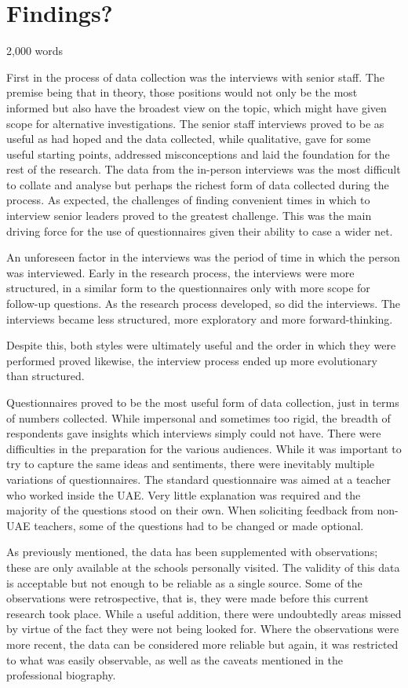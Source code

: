 \section{Findings?}
2,000 words 

First in the process of data collection was the interviews with senior staff. The premise being that in theory, those positions would not only be the most informed but also have the broadest view on the topic, which might have given scope for alternative investigations. The senior staff interviews proved to be as useful as had hoped and the data collected, while qualitative, gave for some useful starting points, addressed misconceptions and laid the foundation for the rest of the research. The data from the in-person interviews was the most difficult to collate and analyse but perhaps the richest form of data collected during the process. As expected, the challenges of finding convenient times in which to interview senior leaders proved to the greatest challenge. This was the main driving force for the use of questionnaires given their ability to case a wider net. 

An unforeseen factor in the interviews was the period of time in which the person was interviewed. Early in the research process, the interviews were more structured, in a similar form to the questionnaires only with more scope for follow-up questions. As the research process developed, so did the interviews. The interviews became less structured, more exploratory and more forward-thinking.

Despite this, both styles were ultimately useful and the order in which they were performed proved likewise, the interview process ended up more evolutionary than structured.

Questionnaires proved to be the most useful form of data collection, just in terms of numbers collected. While impersonal and sometimes too rigid, the breadth of respondents gave insights which interviews simply could not have. There were difficulties in the preparation for the various audiences. While it was important to try to capture the same ideas and sentiments, there were inevitably multiple variations of questionnaires. The standard questionnaire was aimed at a teacher who worked inside the UAE. Very little explanation was required and the majority of the questions stood on their own. When soliciting feedback from non-UAE teachers, some of the questions had to be changed or made optional. 

As previously mentioned, the data has been supplemented with observations; these are only available at the schools personally visited. The validity of this data is acceptable but not enough to be reliable as a single source. Some of the observations were retrospective, that is, they were made before this current research took place. While a useful addition, there were undoubtedly areas missed by virtue of the fact they were not being looked for. Where the observations were more recent, the data can be considered more reliable but again, it was restricted to what was easily observable, as well as the caveats mentioned in the professional biography.

